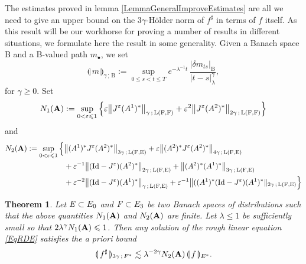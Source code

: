 \documentclass[11pt,a4paper]{amsart}
\renewcommand{\leq}{\leqslant}
\renewcommand{\geq}{\geqslant}
\newcommand{\ssk}{\smallskip}
\newtheorem{thm}{\hspace{-0.15cm}  {\sc Theorem} } %
\numberwithin{equation}{section} %
\begin{document}
\medskip

The estimates proved in lemma \ref{LemmaGeneralImproveEstimates} are all we need to give an upper bound on the $3\gamma$-H\"older norm of $f^\sharp$ in terms of $f$ itself. As this result will be our workhorse for proving a number of results in different situations, we formulate here the result in some generality. Given a Banach space B and a B-valued path $m_\bullet$, we set
$$
\llparenthesis\,m\,\rrparenthesis_{\gamma\,;\,\textrm{B}} := \sup_{0\leq s<t\leq T}e^{-\lambda^{-1}t}\,\frac{\big| \delta m_{ts} \big|_\textrm{B}}{|t-s|^\gamma_\lambda},
$$
for $\gamma\geq 0$. Set 
$$
N_1({\bfA}) := \sup_{0<\varepsilon\leq 1} \Big\{ \varepsilon\big\| J^\varepsilon (A^1)^*\big\|_{\gamma\,;\,\textrm{L}(\textrm{F},\textrm{F})} + \varepsilon^2\big\| J^\varepsilon (A^2)^*\big\|_{2\gamma\,;\,\textrm{L}(\textrm{F},\textrm{F})} \Big\}
$$ 
and
\begin{equation*}
\begin{split}
N_2({\bfA}) := \sup_{0<\varepsilon\leq 1}  \Big\{ &  \big\|(A^1)^* J^\varepsilon  (A^2)^*\big\|_{3\gamma\,;\,\textrm{L}(\textrm{F},\textrm{E})} + \varepsilon \big\|(A^2)^* J^\varepsilon  (A^2)^*\big\|_{4\gamma\,;\,\textrm{L}(\textrm{F},\textrm{E})} \\
&+ \varepsilon^{-1}  \big\|(\textrm{Id} - J^\varepsilon) (A^2)^*\big\|_{2\gamma\,;\,\textrm{L}(\textrm{F},\textrm{E})} + \big\|(A^2) ^* (A^1)^*\big\|_{3\gamma\,;\,\textrm{L}(\textrm{F},\textrm{E})} \\
&+ \varepsilon^{-2} \big\|(\textrm{Id} - J^\varepsilon) (A^1)^*\big\|_{\gamma\,;\,\textrm{L}(\textrm{F},\textrm{E})} + \varepsilon^{-1}\big\|((A^1)^*(\textrm{Id} - J^\varepsilon) (A^1)^*\|_{2\gamma\,;\,\textrm{L}(\textrm{F},\textrm{E})} \Big\}
\end{split}
\end{equation*}

\ssk

\begin{thm}
\label{ThmGeneralRegularityGain} 
Let $\textrm{\emph{E}}\subset E_0$ and $\textrm{\emph{F}}\subset E_3$ be two Banach spaces of distributions such that the above quantities $N_1({\bf A})$ and $N_2({\bf A})$ are finite. Let  $\lambda \le 1$ be sufficiently small so that $2\lambda^{\gamma} N_1({\bfA}) \leq 1$. Then any solution of the rough linear equation \eqref{EqRDE} satisfies the a priori bound 
$$
\llparenthesis\, f^\sharp\,\rrparenthesis_{3\gamma\,;\,F^*} \lesssim \lambda^{-2\gamma} N_2({\bf A})\,\llparenthesis\,f\,\rrparenthesis_{E^*}. 
$$
\end{thm}
\end{document}
